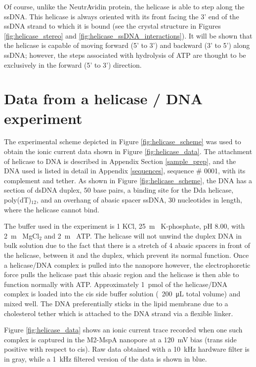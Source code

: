 Of course, unlike the NeutrAvidin protein, the helicase is able to step along the ssDNA.  This helicase is always oriented with its front facing the 3’ end of the ssDNA strand to which it is bound (see the crystal structure in Figures \ref{fig:helicase_stereo} and \ref{fig:helicase_ssDNA_interactions}).  It will be shown that the helicase is capable of moving forward (5’ to 3’) and backward (3’ to 5’) along ssDNA; however, the steps associated with hydrolysis of ATP are thought to be exclusively in the forward (5’ to 3’) direction.

\section{Data from a helicase / DNA experiment}

The experimental scheme depicted in Figure \ref{fig:helicase_scheme} was used to obtain the ionic current data shown in Figure \ref{fig:helicase_data}.  The attachment of helicase to DNA is described in Appendix Section \ref{sample_prep}, and the DNA used is listed in detail in Appendix \ref{sequences}, sequence \# 0001, with its complement and tether.  As shown in Figure \ref{fig:helicase_scheme}, the DNA has a section of dsDNA duplex, \num{50} base pairs, a binding site for the Dda helicase, poly(dT)$_{12}$, and an overhang of abasic spacer ssDNA, \num{30} nucleotides in length, where the helicase cannot bind.

The buffer used in the experiment is \SI{1}{\Molar} KCl, \SI{25}{\m\Molar} K-phosphate, pH \num{8.00}, with \SI{2}{\m\Molar} MgCl$_2$ and \SI{2}{\m\Molar} ATP.  The helicase will not unwind the duplex DNA in bulk solution due to the fact that there is a stretch of \num{4} abasic spacers in front of the helicase, between it and the duplex, which prevent its normal function.  Once a helicase/DNA complex is pulled into the nanopore however, the electrophoretic force pulls the helicase past this abasic region and the helicase is then able to function normally with ATP.  Approximately \SI{1}{\pico\mol} of the helicase/DNA complex is loaded into the cis side buffer solution (~\SI{200}{\micro\liter} total volume) and mixed well.  The DNA preferentially sticks in the lipid membrane due to a cholesterol tether which is attached to the DNA strand via a flexible linker.

Figure \ref{fig:helicase_data} shows an ionic current trace recorded when one such complex is captured in the M2-MspA nanopore at a \SI{120}{\mV} bias (trans side positive with respect to cis).  Raw data obtained with a \SI{10}{\kHz} hardware filter is in gray, while a \SI{1}{\kHz} filtered version of the data is shown in blue.

